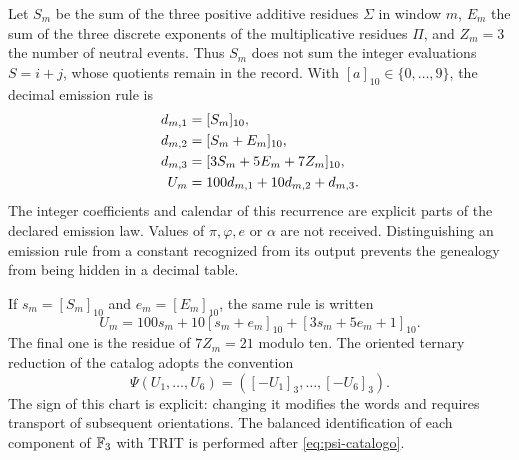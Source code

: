 Let \(S_m\) be the sum of the three positive additive residues \(\Sigma\) in window \(m\), \(E_m\) the sum of the three discrete exponents of the multiplicative residues \(\Pi\), and \(Z_m=3\) the number of neutral events. Thus \(S_m\) does not sum the integer evaluations \(S=i+j\), whose quotients remain in the record. With \([a]_{10}\in\{0,\ldots,9\}\), the decimal emission rule is
\begin{align}
 d_{m,1}&=[S_m]_{10},\notag\\
 d_{m,2}&=[S_m+E_m]_{10},\notag\\
 d_{m,3}&=[3S_m+5E_m+7Z_m]_{10},\notag\\
 U_m&=100d_{m,1}+10d_{m,2}+d_{m,3}.
 \label{eq:emisor-seis}
\end{align}
The integer coefficients and calendar of this recurrence are explicit parts of the declared emission law. Values of \(\pi,\varphi,e\) or \(\alpha\) are not received. Distinguishing an emission rule from a constant recognized from its output prevents the genealogy from being hidden in a decimal table.

If \(s_m=[S_m]_{10}\) and \(e_m=[E_m]_{10}\), the same rule is written
\begin{equation}
 U_m=100s_m+10[s_m+e_m]_{10}+[3s_m+5e_m+1]_{10}.
 \label{eq:acoplamiento}
\end{equation}
The final one is the residue of \(7Z_m=21\) modulo ten. The oriented ternary reduction of the catalog adopts the convention
\begin{equation}
 \Psi(U_1,\ldots,U_6)=([-U_1]_3,\ldots,[-U_6]_3).
 \label{eq:psi-catalogo}
\end{equation}
The sign of this chart is explicit: changing it modifies the words and requires transport of subsequent orientations. The balanced identification of each component of \(\mathbb F_3\) with TRIT is performed after \eqref{eq:psi-catalogo}.

